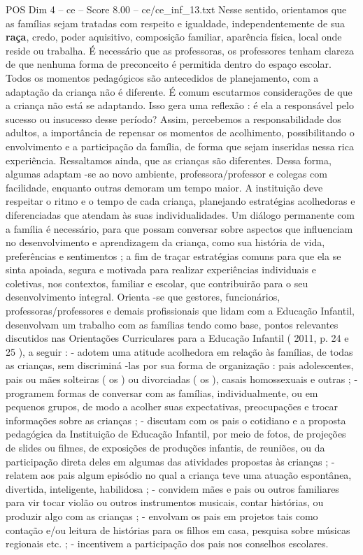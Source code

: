 \begin{textsample}{POS Dim 4 – ce – Score 8.00 – ce/ce\_inf\_13.txt}
Nesse sentido, orientamos que as famílias sejam tratadas com respeito e igualdade, independentemente de sua \textbf{raça}, credo, poder aquisitivo, composição familiar, aparência física, local onde reside ou trabalha.
É necessário que as professoras, os professores tenham clareza de que nenhuma forma de preconceito é permitida dentro do espaço escolar.
Todos os momentos pedagógicos são antecedidos de planejamento, com a adaptação da criança não é diferente.
É comum escutarmos considerações de que a criança não está se adaptando.
Isso gera uma reflexão : é ela a responsável pelo sucesso ou insucesso desse período?
Assim, percebemos a responsabilidade dos adultos, a importância de repensar os momentos de acolhimento, possibilitando o envolvimento e a participação da família, de forma que sejam inseridas nessa rica experiência.
Ressaltamos ainda, que as crianças são diferentes.
Dessa forma, algumas adaptam -se ao novo ambiente, professora/professor e colegas com facilidade, enquanto outras demoram um tempo maior.
A instituição deve respeitar o ritmo e o tempo de cada criança, planejando estratégias acolhedoras e diferenciadas que atendam às suas individualidades.
Um diálogo permanente com a família é necessário, para que possam conversar sobre aspectos que influenciam no desenvolvimento e aprendizagem da criança, como sua história de vida, preferências e sentimentos ; a fim de traçar estratégias comuns para que ela se sinta apoiada, segura e motivada para realizar experiências individuais e coletivas, nos contextos, familiar e escolar, que contribuirão para o seu desenvolvimento integral.
Orienta -se que gestores, funcionários, professoras/professores e demais profissionais que lidam com a Educação Infantil, desenvolvam um trabalho com as famílias tendo como base, pontos relevantes discutidos nas Orientações Curriculares para a Educação Infantil ( 2011, p. 24 e 25 ), a seguir : - adotem uma atitude acolhedora em relação às famílias, de todas as crianças, sem discriminá -las por sua forma de organização : pais adolescentes, pais ou mães solteiras ( os ) ou divorciadas ( os ), casais homossexuais e outras ; - programem formas de conversar com as famílias, individualmente, ou em pequenos grupos, de modo a acolher suas expectativas, preocupações e trocar informações sobre as crianças ; - discutam com os pais o cotidiano e a proposta pedagógica da Instituição de Educação Infantil, por meio de fotos, de projeções de slides ou filmes, de exposições de produções infantis, de reuniões, ou da participação direta deles em algumas das atividades propostas às crianças ; - relatem aos pais algum episódio no qual a criança teve uma atuação espontânea, divertida, inteligente, habilidosa ; - convidem mães e pais ou outros familiares para vir tocar violão ou outros instrumentos musicais, contar histórias, ou produzir algo com as crianças ; - envolvam os pais em projetos tais como contação e/ou leitura de histórias para os filhos em casa, pesquisa sobre músicas regionais etc. ; - incentivem a participação dos pais nos conselhos escolares.

\end{textsample}
